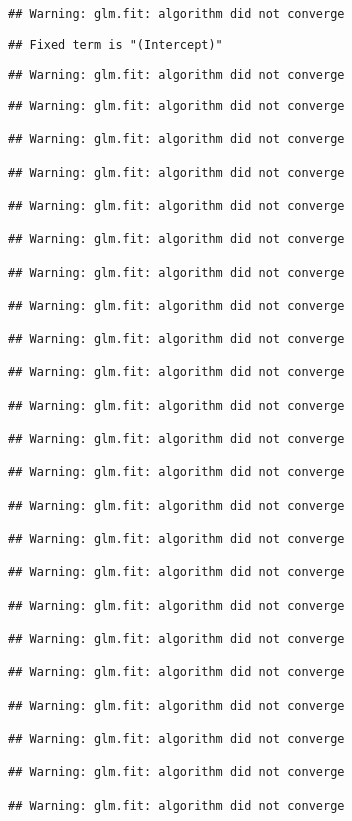 \documentclass[
]{article}
\begin{document}
\begin{verbatim}
## Warning: glm.fit: algorithm did not converge
\end{verbatim}

\begin{verbatim}
## Fixed term is "(Intercept)"
\end{verbatim}

\begin{verbatim}
## Warning: glm.fit: algorithm did not converge
\end{verbatim}

\begin{verbatim}
## Warning: glm.fit: algorithm did not converge

## Warning: glm.fit: algorithm did not converge

## Warning: glm.fit: algorithm did not converge

## Warning: glm.fit: algorithm did not converge

## Warning: glm.fit: algorithm did not converge

## Warning: glm.fit: algorithm did not converge

## Warning: glm.fit: algorithm did not converge

## Warning: glm.fit: algorithm did not converge

## Warning: glm.fit: algorithm did not converge

## Warning: glm.fit: algorithm did not converge

## Warning: glm.fit: algorithm did not converge

## Warning: glm.fit: algorithm did not converge

## Warning: glm.fit: algorithm did not converge

## Warning: glm.fit: algorithm did not converge

## Warning: glm.fit: algorithm did not converge

## Warning: glm.fit: algorithm did not converge

## Warning: glm.fit: algorithm did not converge

## Warning: glm.fit: algorithm did not converge

## Warning: glm.fit: algorithm did not converge

## Warning: glm.fit: algorithm did not converge

## Warning: glm.fit: algorithm did not converge

## Warning: glm.fit: algorithm did not converge


\end{verbatim}
\end{document}
